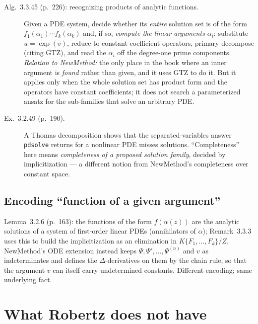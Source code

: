 \documentclass[11pt]{article}
\newcommand{\code}[1]{\texttt{#1}}
\begin{document}
\begin{description}
\item[Alg.~3.3.45 (p.~226): recognizing products of analytic functions.]
  Given a PDE system, decide whether its \emph{entire} solution set is of the
  form $f_1(\alpha_1)\cdots f_k(\alpha_k)$ and, if so, \emph{compute the
  linear arguments $\alpha_i$}: substitute $u=\exp(v)$, reduce to
  constant-coefficient operators, primary-decompose (citing GTZ), and read the
  $\alpha_i$ off the degree-one prime components. \\
  \emph{Relation to NewMethod:} the only place in the book where an inner
  argument is \emph{found} rather than given, and it uses GTZ to do it. But it
  applies only when the whole solution set has product form and the operators
  have constant coefficients; it does not search a parameterized ansatz for
  the sub-families that solve an arbitrary PDE.

\item[Ex.~3.2.49 (p.~190).] A Thomas decomposition shows that the
  separated-variables answer \code{pdsolve} returns for a nonlinear PDE misses
  solutions. ``Completeness'' here means \emph{completeness of a proposed
  solution family}, decided by implicitization --- a different notion from
  NewMethod's completeness over constant space.
\end{description}

\subsection{Encoding ``function of a given argument''}

Lemma~3.2.6 (p.~163): the functions of the form $f(\alpha(z))$ are the
analytic solutions of a system of first-order linear PDEs (annihilators of
$\alpha$); Remark~3.3.3 uses this to build the implicitization as an
elimination in $K\{F_1,\dots,F_k\}/Z$. NewMethod's ODE extension instead keeps
$\Psi,\Psi',\dots,\Psi^{(n)}$ and $v$ as indeterminates and defines the
$\Delta$-derivatives on them by the chain rule, so that the argument $v$ can
itself carry undetermined constants. Different encoding; same underlying
fact.

\section{What Robertz does not have}
\end{document}
